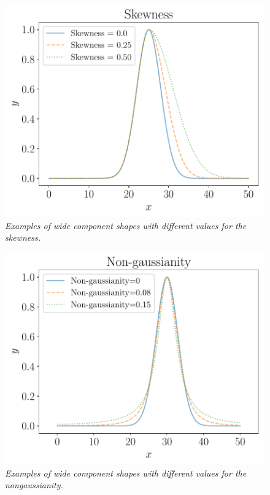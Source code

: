 \documentclass[a4paper, 12pt]{article}
\begin{document}
\begin{figure}[!ht]
\centering
\includegraphics[scale=0.7]{figures/skewness.pdf}
\caption{\it Examples of wide component shapes with different values
for the skewness.\label{fig:skewness}}
\end{figure}

\begin{figure}[!ht]
\centering
\includegraphics[scale=0.7]{figures/nongaussianity.pdf}
\caption{\it Examples of wide component shapes with different values
for the nongaussianity.\label{fig:nongaussianity}}
\end{figure}
\end{document}

